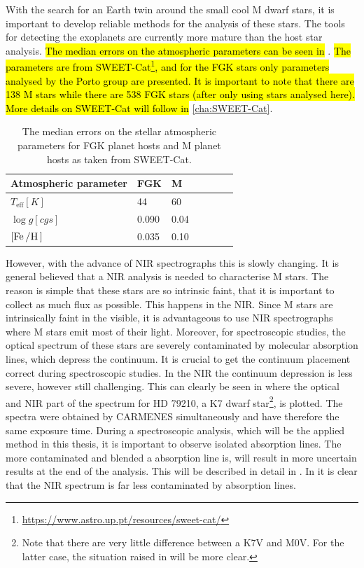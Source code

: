 With the search for an Earth twin around the small cool M dwarf stars, it is important to develop
reliable methods for the analysis of these stars. The tools for detecting the exoplanets are
currently more mature than the host star analysis. \hl{ The median errors on the atmospheric
parameters can be seen in} . \hl{The parameters are from
SWEET-Cat\footnote{ \url{https://www.astro.up.pt/resources/sweet-cat/}}, and for the FGK stars only
parameters analysed by the Porto group are presented. It is important to note that there are 138 M
stars while there are 538 FGK stars (after only using stars analysed here). More details on
SWEET-Cat will follow in} \cref{cha:SWEET-Cat}.
\begin{table}[htb!]
    \caption{The median errors on the stellar atmospheric parameters for FGK planet hosts and M
             planet hosts as taken from SWEET-Cat.}
    \label{tab:standardErrors}
    \centering
    \begin{tabular}{lllllll}
      \hline\hline
        Atmospheric parameter      & FGK    & M    \\
      \hline
        $T_\mathrm{eff} [\si{K}]$  & 44     & 60   \\
        $\log g [\si{cgs}]$        & 0.090  & 0.04 \\
        $[\ion{Fe}/\ion{H}]$       & 0.035  & 0.10 \\
      \hline
    \end{tabular}
\end{table}
However, with the advance of NIR spectrographs this is slowly changing. It is general believed that
a NIR analysis is needed to characterise M stars. The reason is simple that these stars are so
intrinsic faint, that it is important to collect as much flux as possible. This happens in the NIR.
Since M stars are intrinsically faint in the visible, it is advantageous to use NIR spectrographs
where M stars emit most of their light. Moreover, for spectroscopic studies, the optical spectrum of
these stars are severely contaminated by molecular absorption lines, which depress the continuum. It
is crucial to get the continuum placement correct during spectroscopic studies. In the NIR the
continuum depression is less severe, however still challenging. This can clearly be seen in
 where the optical and NIR part of the spectrum for HD 79210, a K7 dwarf
star\footnote{Note that there are very little difference between a K7V and M0V. For the latter case,
the situation raised in  will be more clear.}, is plotted. The spectra were
obtained by CARMENES simultaneously and have therefore the same exposure time. During a
spectroscopic analysis, which will be the applied method in this thesis, it is important to observe
isolated absorption lines. The more contaminated and blended a absorption line is, will result in
more uncertain results at the end of the analysis. This will be described in detail in
. In  it is clear that the NIR spectrum is far less
contaminated by absorption lines.

